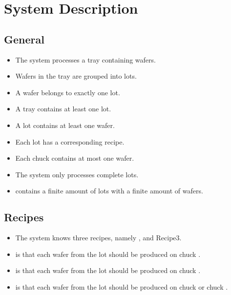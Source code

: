 \section{System Description}

\subsection{General}
\begin{itemize}
    \item The system processes a tray containing wafers.
    \item Wafers in the tray are grouped into lots.
    \item A wafer belongs to exactly one lot.
    \item A tray contains at least one lot.
    \item A lot contains at least one wafer.
    \item Each lot has a corresponding recipe.
    \item Each chuck contains at most one wafer.
    \item The system only processes complete lots.
    \item \tray contains a finite amount of lots with a finite amount of wafers.
\end{itemize}

\subsection{Recipes}
\begin{itemize}
    \item The system knows three recipes, namely \recipeOne, \recipeTwo and Recipe3.
    \item \recipeOne is that each wafer from the lot should be produced on chuck \chuckA.
    \item \recipeTwo is that each wafer from the lot should be produced on chuck \chuckB.
    \item \recipeThree is that each wafer from the lot should be produced on chuck \chuckA or chuck \chuckB.
\end{itemize}

